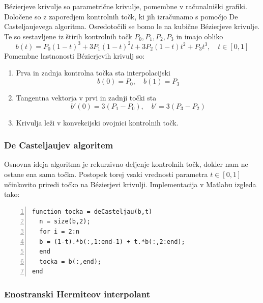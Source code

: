 \documentclass[a4paper,12pt]{article}
\begin{document}
	B\'{e}zierjeve krivulje so parametrične krivulje, pomembne v računalniški grafiki. Določene so z zaporedjem kontrolnih točk, ki jih izračunamo s pomočjo De Casteljaujevega algoritma.
	Osredotočili se bomo le na kubične B\'{e}zierjeve krivulje. Te so sestavljene iz štirih kontrolnih točk $P_0, P_1, P_2, P_3$ in imajo obliko
	\begin{equation*}
		b(t) = P_0(1-t)^3 + 3P_1(1-t)^2t + 3P_2(1-t)t^2 + P_3t^3, \quad t \in [0,1]
	\end{equation*}
	Pomembne lastnonosti B\'{e}zierjevih krivulj so: 
	\begin{enumerate}[label=(\roman*)]
		\item Prva in zadnja kontrolna točka sta interpolacijski 
		$$b(0) = P_0,\quad b(1) = P_3$$
		\item Tangentna vektorja v prvi in zadnji točki sta
		$$b'(0) = 3(P_1 - P_0),\quad b' = 3(P_3 - P_2)$$
		\item Krivulja leži v konvekcijski ovojnici kontrolnih točk.

	\end{enumerate}
	
	\subsubsection{De Casteljaujev algoritem}
	
	Osnovna ideja algoritma je rekurzivno deljenje kontrolnih točk, dokler nam ne ostane ena sama točka. Postopek torej vsaki vrednosti parametra $t \in [0,1]$ učinkovito priredi
	točko na B\'{e}zierjevi krivulji.
	Implementacija v Matlabu izgleda tako:
	\begin{lstlisting}[style=Matlab-editor,numbers=left]
function tocka = deCasteljau(b,t)
  n = size(b,2);
  for i = 2:n
  b = (1-t).*b(:,1:end-1) + t.*b(:,2:end);   
  end
  tocka = b(:,end);
end
	\end{lstlisting}
	
	
	\subsubsection{Enostranski Hermiteov interpolant}
	
\end{document}
